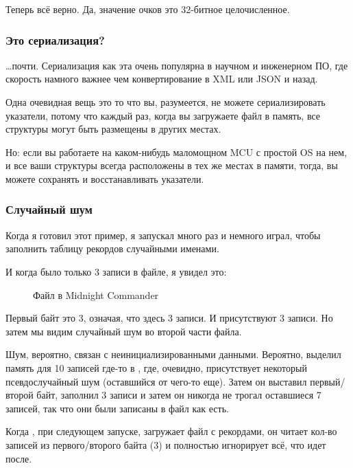 Теперь всё верно. Да, значение очков это 32-битное целочисленное.

\subsubsection{Это сериализация?}

\dots почти.
Сериализация как эта очень популярна в научном и инженерном ПО, где скорость намного важнее чем конвертирование в
\ac{XML} или \ac{JSON} и назад.

Одна очевидная вещь это то что вы, разумеется, не можете сериализировать указатели, потому что каждый раз, когда вы загружаете
файл в память, все структуры могут быть размещены в других местах.

Но: если вы работаете на каком-нибудь маломощном \ac{MCU} с простой \ac{OS} на нем,
и все ваши структуры всегда расположены в тех же местах в памяти, тогда, вы можете сохранять и восстанавливать указатели.

\subsubsection{Случайный шум}

Когда я готовил этот пример, я запускал  много раз и немного играл, чтобы заполнить таблицу рекордов
случайными именами.

И когда было только 3 записи в файле, я увидел это:

\begin{figure}[H]
\centering
{}
\caption{Файл  в Midnight Commander}
\end{figure}

Первый байт это 3, означая, что здесь 3 записи.
И присутствуют 3 записи.
Но затем мы видим случайный шум во второй части файла.

Шум, вероятно, связан с неинициализированными данными.
Вероятно,  выделил память для 10 записей где-то в , где, очевидно, присутствует
некоторый псевдослучайный шум (оставшийся от чего-то еще).
Затем он выставил первый/второй байт, заполнил 3 записи и затем он никогда не трогал оставшиеся 7 записей,
так что они были записаны в файл как есть.

Когда , при следующем запуске, загружает файл с рекордами, он читает кол-во записей из первого/второго байта (3)
и полностью игнорирует всё, что идет после.

